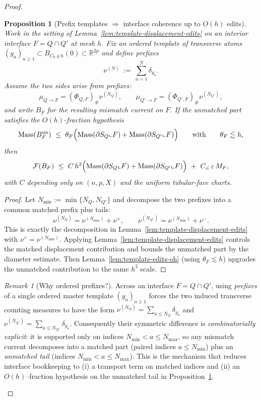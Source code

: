 \documentclass[11pt]{article}
\numberwithin{equation}{section}  %
\theoremstyle{plain}
\newtheorem{proposition}[theorem]{Proposition}
\theoremstyle{definition}
\theoremstyle{remark}
\newtheorem{remark}[theorem]{Remark}
\newcommand{\R}{\mathbb{R}}
\DeclareMathOperator{\Mass}{Mass}
\begin{document}
\begin{proof}
\begin{proposition}[Prefix templates $\Rightarrow$ interface coherence up to $O(h)$ edits]\label{prop:prefix-template-coherence}
Work in the setting of Lemma~\ref{lem:template-displacement-edits} on an interior interface $F=Q\cap Q'$ at mesh $h$.
Fix an ordered template of transverse atoms $(y_a)_{a\ge 1}\subset B_{C_0\varrho h}(0)\subset\R^{2p}$ and define prefixes
\[
\nu^{(N)}\ :=\ \sum_{a=1}^{N}\delta_{y_a}.
\]
Assume the two sides arise from prefixes:
\[
\mu_{Q\to F}=(\Phi_{Q,F})_\#\nu^{(N_Q)},\qquad
\mu_{Q'\to F}=(\Phi_{Q',F})_\#\nu^{(N_{Q'})},
\]
and write $B_F$ for the resulting mismatch current on $F$.
If the unmatched part satisfies the $O(h)$-fraction hypothesis
\[
\Mass(B_F^{\mathrm{un}})\ \le\ \theta_F\Bigl(\Mass(\partial S_Q\llcorner F)+\Mass(\partial S_{Q'}\llcorner F)\Bigr)
\qquad\text{with}\qquad \theta_F\lesssim h,
\]
then
\[
\mathcal F(B_F)\ \le\ C\,h^2\Bigl(\Mass(\partial S_Q\llcorner F)+\Mass(\partial S_{Q'}\llcorner F)\Bigr)\ +\ C_{\angle}\,\varepsilon\,M_F,
\]
with $C$ depending only on $(n,p,X)$ and the uniform tubular-face charts.
\end{proposition}


\begin{proof}
Let $N_{\min}:=\min\{N_Q,N_{Q'}\}$ and decompose the two prefixes into a common matched prefix plus tails:
\[
\nu^{(N_Q)}=\nu^{(N_{\min})}+\nu^{+},
\qquad
\nu^{(N_{Q'})}=\nu^{(N_{\min})}+\nu^{-}.
\]
This is exactly the decomposition in Lemma~\ref{lem:template-displacement-edits} with $\nu^{\wedge}=\nu^{(N_{\min})}$.
Applying Lemma~\ref{lem:template-displacement-edits} controls the matched displacement contribution and bounds the unmatched part by the diameter estimate.
Then Lemma~\ref{lem:template-edits-oh} (using $\theta_F\lesssim h$) upgrades the unmatched contribution to the same $h^2$ scale.
\end{proof}


\begin{remark}[Why ordered prefixes?]\label{rem:why-prefix}
Across an interface $F=Q\cap Q'$, using \emph{prefixes} of a single ordered master template $(y_a)_{a\ge 1}$
forces the two induced transverse counting measures to have the form
$\nu^{(N_Q)}=\sum_{a\le N_Q}\delta_{y_a}$ and $\nu^{(N_{Q'})}=\sum_{a\le N_{Q'}}\delta_{y_a}$.
Consequently their symmetric difference is \emph{combinatorially explicit}: it is supported only on indices
$N_{\min}<a\le N_{\max}$, so any mismatch current decomposes into a matched part (paired indices $a\le N_{\min}$)
plus an \emph{unmatched tail} (indices $N_{\min}<a\le N_{\max}$).
This is the mechanism that reduces interface bookkeeping to (i) a transport term on matched indices and
(ii) an $O(h)$--fraction hypothesis on the unmatched tail in Proposition~\ref{prop:prefix-template-coherence}.
\end{remark}




\end{proof}
\end{document}
